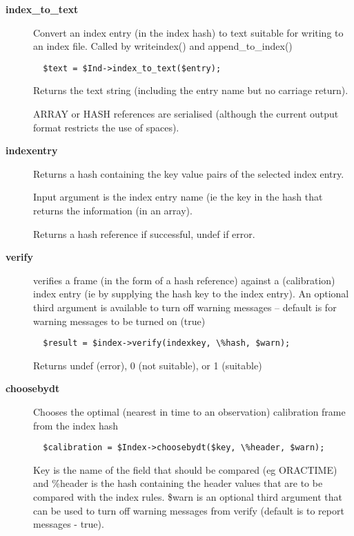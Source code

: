 \begin{description}
\begin{description}
\item[{\textbf{index\_to\_text}}] \mbox{}

Convert an index entry (in the index hash) to text suitable for
writing to an index file. Called by writeindex() and append\_to\_index()

\begin{verbatim}
  $text = $Ind->index_to_text($entry);
\end{verbatim}


Returns the text string (including the entry name but no carriage 
return).



ARRAY or HASH references are serialised (although the current output
format restricts the use of spaces).


\item[{\textbf{indexentry}}] \mbox{}

Returns a hash containing the key value pairs of the
selected index entry.



Input argument is the index entry name (ie the key in the hash
that returns the information (in an array).



Returns a hash reference if successful, undef if error.


\item[{\textbf{verify}}] \mbox{}

verifies a frame (in the form of a hash reference) against a 
(calibration) index entry (ie by supplying the hash key to the index
entry). An optional third argument is available to turn off warning 
messages -- default is for warning messages to be turned on (true)

\begin{verbatim}
  $result = $index->verify(indexkey, \%hash, $warn);
\end{verbatim}


Returns undef (error), 0 (not suitable), or 1 (suitable)


\item[{\textbf{choosebydt}}] \mbox{}

Chooses the optimal (nearest in time to an observation) calibration
frame from the index hash

\begin{verbatim}
  $calibration = $Index->choosebydt($key, \%header, $warn);
\end{verbatim}


Key is the name of the field that should be compared (eg ORACTIME)
and \%header is the hash containing the header values that are to
be compared with the index rules. \$warn is an optional third argument
that can be used to turn off warning messages from verify (default
is to report messages - true).




\end{description}
\end{description}
